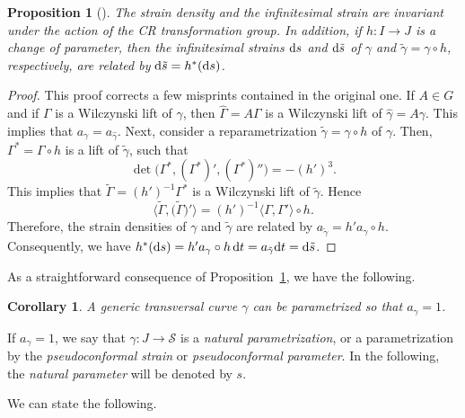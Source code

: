 \documentclass[10pt,a4paper]{amsart}
\numberwithin{equation}{section}
\newtheorem{Corollary}[Theorem]{Corollary}
\newtheorem{Proposition}[Theorem]{Proposition}
 { \theoremstyle{definition}
\newtheorem{Definition}[Theorem]{Definition}
\newtheorem{Note}[Theorem]{Note}
\newtheorem{Example}[Theorem]{Example}
\newtheorem{Remark}[Theorem]{Remark} }
\def\S{\mathcal{S}}
\def\S{\mathcal{S}}
\begin{document}
\begin{Proposition}[\cite{MNS-Kharkiv}]\label{2.2.1}
The strain density and the infinitesimal strain are invariant under the action of the CR transformation group.
In addition, if $h\colon I \to J$ is a change of parameter, then the infinitesimal strains ${\rm d}s$ and ${\rm d}\tilde s$
of $\gamma$ and $\tilde \gamma=\gamma\circ h$,
respectively, are related by ${\rm d}\tilde s = h^*({\rm d}s)$.
\end{Proposition}

\begin{proof}
This proof corrects a few misprints contained in the original one.
If $A\in {G}$ and if $\Gamma$ is a Wilczynski lift of $\gamma$, then $\hat{\Gamma} = A\Gamma$ is a
Wilczynski lift of $\hat\gamma = A\gamma$. This implies that $a_\gamma = a_{\hat\gamma}$.
Next, consider a reparametrization $\tilde\gamma=\gamma\circ h$ of $\gamma$. Then, $\Gamma^*=\Gamma\circ h$
is a lift of $\tilde\gamma$, such that
\[
 \det\big(\Gamma^*,(\Gamma^*)' ,(\Gamma^*)'' \big) = -(h')^3.
\]
This implies that $\tilde\Gamma=(h')^{ -1}\Gamma^*$ is a Wilczynski lift of $\tilde\gamma$.
Hence
\[
 \big\langle\tilde\Gamma,\big(\tilde\Gamma\big)'\big\rangle
 =(h')^{ -1}\langle\Gamma,\Gamma'\rangle\circ h.
\]
Therefore, the strain densities of $\gamma$ and $\tilde\gamma$ are related by
$a_{\tilde\gamma}=h'a_\gamma\circ h$.
Consequently, we have
$h^*({\rm d}s)= h'a_\gamma\circ h \, {\rm d}t= a_{\tilde\gamma} {\rm d}t ={\rm d}\tilde s$. \end{proof}

As a straightforward consequence of Proposition~\ref{2.2.1}, we have the following.

\begin{Corollary}
A generic transversal
curve $\gamma$ can be parametrized so that $a_\gamma = 1$.
\end{Corollary}

\begin{Definition}
If $a_\gamma = 1$, we say that $\gamma \colon J \to\S$ is a \emph{natural parametrization},
or a parametrization by the {\em pseudoconformal strain} or {\em pseudoconformal parameter}.
In the following, the {\em natural parameter} will be denoted by $s$.
\end{Definition}


We can state the following.
\end{document}
